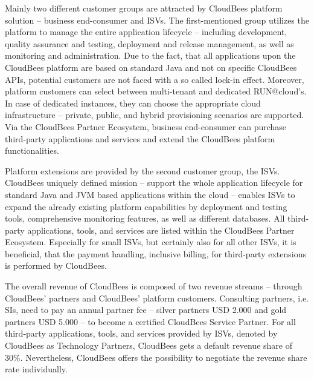 Mainly two different customer groups are attracted by CloudBees platform solution -- business end-consumer and \acp{ISV}. The first-mentioned group utilizes the platform to manage the entire application lifecycle -- including development, quality assurance and testing, deployment and release management, as well as monitoring and administration. Due to the fact, that all applications upon the CloudBees platform are based on standard Java and not on specific CloudBees \acp{API}, potential customers are not faced with a so called lock-in effect. Moreover, platform customers can select between multi-tenant and dedicated RUN@cloud's. In case of dedicated instances, they can choose the appropriate cloud infrastructure -- private, public, and hybrid provisioning scenarios are supported. Via the CloudBees Partner Ecosystem, business end-consumer can purchase third-party applications and services and extend the CloudBees platform functionalities. 

Platform extensions are provided by the second customer group, the \acp{ISV}. CloudBees uniquely defined mission -- support the whole application lifecycle for standard Java and \ac{JVM} based applications within the cloud -- enables \acp{ISV} to expand the already existing platform capabilities by deployment and testing tools, comprehensive monitoring features, as well as different databases. All third-party applications, tools, and services are listed within the CloudBees Partner Ecosystem. Especially for small \acp{ISV}, but certainly also for all other \acp{ISV}, it is beneficial, that the payment handling, inclusive billing, for third-party extensions is performed by CloudBees.

The overall revenue of CloudBees is composed of two revenue streams -- through CloudBees' partners and CloudBees' platform customers. Consulting partners, i.e. \acp{SI}, need to pay an annual partner fee -- silver partners USD 2.000 and gold partners USD 5.000 -- to become a certified \linebreak CloudBees Service Partner. For all third-party applications, tools, and services provided by \acp{ISV}, denoted by CloudBees as Technology Partners, CloudBees gets a default revenue share of 30\%. Nevertheless, CloudBees offers the possibility to negotiate the revenue share rate individually.

